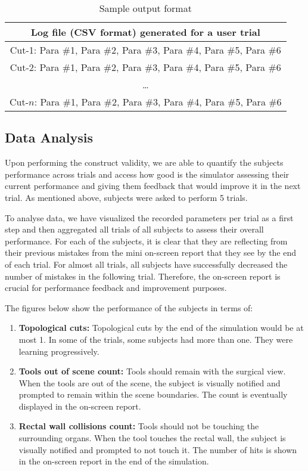 \begin{table}
\small
\centering
\begin{tabular}{c}
 Log file (CSV format) generated for a user trial\\
 \toprule
 Cut-1: Para \#1, Para \#2, Para \#3, Para \#4, Para \#5, Para \#6 \\
 \midrule
 Cut-2: Para \#1, Para \#2, Para \#3, Para \#4, Para \#5, Para \#6\\
 \midrule
 \ldots\\
 \midrule
 Cut-$n$: Para \#1, Para \#2, Para \#3, Para \#4, Para \#5, Para \#6\\
 \bottomrule
\end{tabular}
\caption{Sample output format}\label{tab:csv}
\end{table}

\subsection{Data Analysis}
Upon performing the construct validity, we are able to quantify the subjects performance across trials and access how good is the simulator assessing their current performance and giving them feedback that would improve it in the next trial. As mentioned above, subjects were asked to perform 5 trials.

To analyse data, we have visualized the recorded parameters per trial as a first step and then aggregated all trials of all subjects to assess their overall performance. For each of the subjects, it is clear that they are reflecting from their previous mistakes from the mini on-screen report that they see by the end of each trial. For almost all trials, all subjects have successfully decreased the number of mistakes in the following trial. Therefore, the on-screen report is crucial for performance feedback and improvement purposes.

The figures below show the performance of the subjects in terms of:
\begin{enumerate}
    \item \textbf{Topological cuts:} Topological cuts by the end of the simulation would be at most 1. In some of the trials, some subjects had more than one. They were learning progressively.
    \item \textbf{Tools out of scene count:} Tools should remain with the surgical view. When the tools are out of the scene, the subject is visually notified and prompted to remain within the scene boundaries. The count is eventually displayed in the on-screen report.
    \item \textbf{Rectal wall collisions count:} Tools should not be touching the surrounding organs. When the tool touches the rectal wall, the subject is visually notified and prompted to not touch it. The number of hits is shown in the on-screen report in the end of the simulation.
\end{enumerate}

